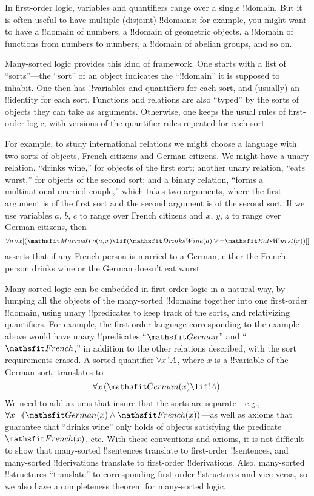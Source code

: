 \documentclass[../../../include/open-logic-section]{subfiles}
\begin{document}


In first-order logic, variables and quantifiers range over a single
!!{domain}. But it is often useful to have multiple (disjoint)
!!{domain}s: for example, you might want to have a !!{domain} of numbers,
a !!{domain} of geometric objects, a !!{domain} of functions from
numbers to numbers, a !!{domain} of abelian groups, and so on.

Many-sorted logic provides this kind of framework. One starts with a
list of ``sorts''---the ``sort'' of an object indicates the
``!!{domain}'' it is supposed to inhabit. One then has !!{variable}s
and quantifiers for each sort, and (usually) an !!{identity} for each
sort. Functions and relations are also ``typed'' by the sorts of
objects they can take as arguments. Otherwise, one keeps the usual
rules of first-order logic, with versions of the quantifier-rules
repeated for each sort.

For example, to study international relations we might choose a
language with two sorts of objects, French citizens and German
citizens. We might have a unary relation, ``drinks wine,'' for objects
of the first sort; another unary relation, ``eats wurst,'' for objects
of the second sort; and a binary relation, ``forms a multinational
married couple,'' which takes two arguments, where the first argument
is of the first sort and the second argument is of the second sort. If
we use variables $a$, $b$, $c$ to range over French citizens and $x$, $y$, $z$
to range over German citizens, then
\[
\lforall[a][\lforall x][(\Atom{\Obj{MarriedTo}}{a,x} \lif
(\Atom{\Obj{DrinksWine}}{a} \lor \lnot \Atom{\Obj{EatsWurst}}{x})]]
\]
asserts that if any French person is married to a German, either the
French person drinks wine or the German doesn't eat wurst.

Many-sorted logic can be embedded in first-order logic in a natural
way, by lumping all the objects of the many-sorted !!{domain}s together
into one first-order !!{domain}, using unary !!{predicate}s to keep track of
the sorts, and relativizing quantifiers. For example, the first-order
language corresponding to the example above would have unary !!{predicate}s
``$\Obj{German}$'' and ``$\Obj{French}$,'' in addition to the other relations
described, with the sort requirements erased. A sorted quantifier $\lforall[x][!A]$, where $x$ is a !!{variable} of the German sort, translates to
\[
\lforall[x][(\Atom{\Obj{German}}{x} \lif !A)].
\]
We need to add axioms that insure that the sorts are separate---e.g.,
$\lforall[x][\lnot (\Atom{\Obj{German}}{x} \land
  \Atom{\Obj{French}}{x})]$---as well as axioms that guarantee that
``drinks wine'' only holds of objects satisfying the predicate
$\Atom{\Obj{French}}{x}$, etc. With these conventions and axioms, it
is not difficult to show that many-sorted !!{sentence}s translate to
first-order !!{sentence}s, and many-sorted !!{derivation}s translate
to first-order !!{derivation}s. Also, many-sorted !!{structure}s
``translate'' to corresponding first-order !!{structure}s and
vice-versa, so we also have a completeness theorem for many-sorted
logic.
\end{document}
